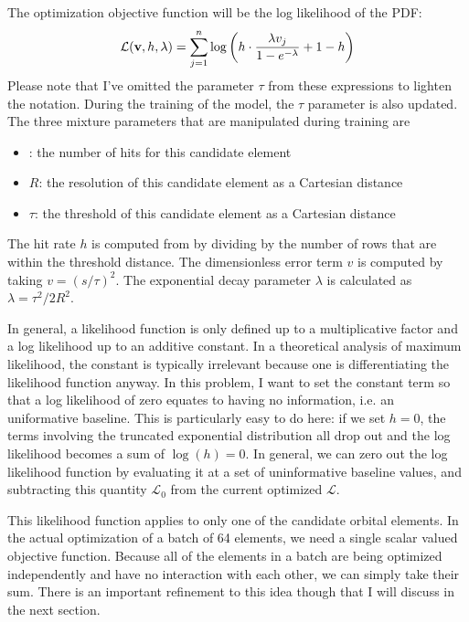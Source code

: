 The optimization objective function will be the log likelihood of the PDF:
$$ \mathcal{L}(\mathbf{v}, h, \lambda) = \sum_{j=1}^{n} \log \left( h \cdot \frac{\lambda v_j}{1 - e^{-\lambda}} + 1 - h \right)$$
Please note that I've omitted the parameter $\tau$ from these expressions to lighten the notation.
During the training of the model, the $\tau$ parameter is also updated.
The three mixture parameters that are manipulated during training are 
\begin{itemize}
\item {}: the number of hits for this candidate element
\item $R$: the resolution of this candidate element as a Cartesian distance
\item $\tau$: the threshold of this candidate element as a Cartesian distance
\end{itemize}
The hit rate $h$ is computed from  by dividing by the number of rows that are within the threshold distance.
The dimensionless error term $v$ is computed by taking $v = (s/\tau)^2$.
The exponential decay parameter $\lambda$ is calculated as $\lambda = \tau^2 / 2R^2$.

In general, a likelihood function is only defined up to a multiplicative factor and a log likelihood up to an additive constant.
In a theoretical analysis of maximum likelihood, the constant is typically irrelevant because one is differentiating the likelihood function anyway.
In this problem, I want to set the constant term so that a log likelihood of zero equates to having no information,
i.e. an uniformative baseline.
This is particularly easy to do here: if we set $h=0$, the terms involving the truncated exponential distribution all drop out 
and the log likelihood becomes a sum of $\log(h) = 0$.
In general, we can zero out the log likelihood function by evaluating it at a set of uninformative baseline values, 
and subtracting this quantity $\mathcal{L}_0$ from the current optimized $\mathcal{L}$.

This likelihood function applies to only one of the candidate orbital elements.
In the actual optimization of a batch of 64 elements, we need a single scalar valued objective function.
Because all of the elements in a batch are being optimized independently and have no interaction with each other, we can simply take their sum.
There is an important refinement to this idea though that I will discuss in the next section.


